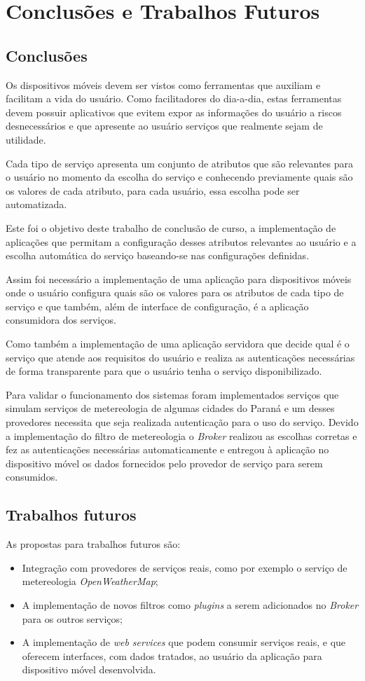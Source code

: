 \chapter{Conclusões e Trabalhos Futuros}\label{cha:conclusao}

\section{Conclusões}
Os dispositivos móveis devem ser vistos como ferramentas que auxiliam e facilitam a vida do usuário. Como facilitadores do dia-a-dia, estas ferramentas devem possuir aplicativos que evitem expor as informações do usuário a riscos desnecessários e que apresente ao usuário serviços que realmente sejam de utilidade.

Cada tipo de serviço apresenta um conjunto de atributos que são relevantes para o usuário no momento da escolha do serviço e conhecendo previamente quais são os valores de cada atributo, para cada usuário, essa escolha pode ser automatizada.

Este foi o objetivo deste trabalho de conclusão de curso, a implementação de aplicações que permitam a configuração desses atributos relevantes ao usuário e a escolha automática do serviço baseando-se nas configurações definidas.

Assim foi necessário a implementação de uma aplicação para dispositivos móveis onde o usuário configura quais são os valores para os atributos de cada tipo de serviço e que também, além de interface de configuração, é a aplicação consumidora dos serviços.

Como também a implementação de uma aplicação servidora que decide qual é o serviço que atende aos requisitos do usuário e realiza as autenticações necessárias de forma transparente para que o usuário tenha o serviço disponibilizado.

Para validar o funcionamento dos sistemas foram implementados serviços que simulam serviços de metereologia de algumas cidades do Paraná e um desses provedores necessita que seja realizada autenticação para o uso do serviço. Devido a implementação do filtro de metereologia o \textit{Broker} realizou as escolhas corretas e fez as autenticações necessárias automaticamente e entregou à aplicação no dispositivo móvel os dados fornecidos pelo provedor de serviço para serem consumidos.

\section{Trabalhos futuros}
As propostas para trabalhos futuros são:
\begin{itemize}
	\item Integração com provedores de serviços reais, como por exemplo o serviço de metereologia \textit{OpenWeatherMap};
	\item A implementação de novos filtros como \textit{plugins} a serem adicionados no \textit{Broker} para os outros serviços;
	\item A implementação de \textit{web services} que podem consumir serviços reais, e que oferecem interfaces, com dados tratados, ao usuário da aplicação para dispositivo móvel desenvolvida.
\end{itemize}